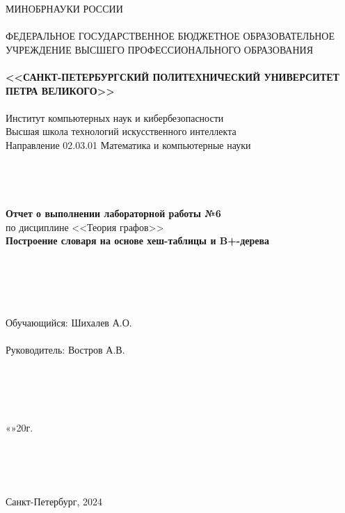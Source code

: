 \documentclass[11pt,a4paper,final]{article} %
\begin{document}
	
\thispagestyle{empty}

\begin{center}
	{\Large МИНОБРНАУКИ РОССИИ}\\
	~\\
	{\large ФЕДЕРАЛЬНОЕ ГОСУДАРСТВЕННОЕ БЮДЖЕТНОЕ ОБРАЗОВАТЕЛЬНОЕ УЧРЕЖДЕНИЕ ВЫСШЕГО ПРОФЕССИОНАЛЬНОГО ОБРАЗОВАНИЯ}\\
	~\\
	{\Large \bf <<САНКТ-ПЕТЕРБУРГСКИЙ ПОЛИТЕХНИЧЕСКИЙ УНИВЕРСИТЕТ ПЕТРА ВЕЛИКОГО>>}\\
	~\\
	{\large Институт компьютерных наук и кибербезопасности }\\
	{\large Высшая школа технологий искусственного интеллекта}\\
	{\large Направление 02.03.01 Математика и компьютерные науки}\\
	~\\
	~\\
	~\\
	~\\
	{\Large \bf  Отчет о выполнении лабораторной работы №6}\\
	\vspace{3mm}
	{\Large {по дисциплине <<Теория графов>>}}\\
	\vspace{3mm}
	{\Large \bf Построение словаря на основе хеш-таблицы и B+-дерева }\\
	~\\
	~\\
	~\\
	~\\
	~\\
	{\large Обучающийся: \underline{\hspace{3.5cm}} \hspace{12mm} Шихалев А.О.}\\
	~\\
	{\large Руководитель: \underline{\hspace{3.5cm}} \hspace{12mm} Востров А.В.}\\
	~\\
	~\\
	~\\
	~\\
\end{center}
\begin{flushright}
	
	«\underline{\hspace{1cm}}»\underline{\hspace{3cm}}20\underline{\hspace{0.7cm}}г.
\end{flushright}
~\\
~\\
~\\
\begin{center}
	{\large Санкт-Петербург, 2024}
\end{center}
\end{document}
